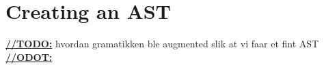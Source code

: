 \section{Creating an AST}
\underline{\textbf{\LARGE //TODO:}}
hvordan gramatikken ble augmented slik at vi faar et fint AST
\underline{\textbf{\LARGE //ODOT:}}